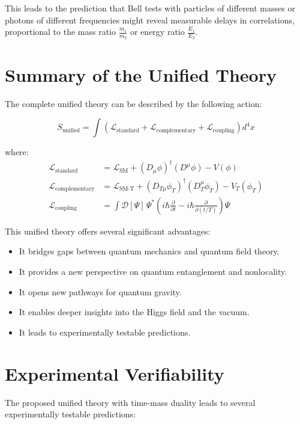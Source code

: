 \documentclass{article}
\begin{document}
	This leads to the prediction that Bell tests with particles of different masses or photons of different frequencies might reveal measurable delays in correlations, proportional to the mass ratio $\frac{m_1}{m_2}$ or energy ratio $\frac{E_1}{E_2}$.
	
	\section{Summary of the Unified Theory}
	
	The complete unified theory can be described by the following action:
	
	\begin{equation}
		S_\text{unified} = \int \left( \mathcal{L}_\text{standard} + \mathcal{L}_\text{complementary} + \mathcal{L}_\text{coupling} \right) d^4x
	\end{equation}
	
	where:
	\begin{align}
		\mathcal{L}_\text{standard} &= \mathcal{L}_\text{SM} + (D_\mu \phi)^\dagger (D^\mu \phi) - V(\phi) \\
		\mathcal{L}_\text{complementary} &= \mathcal{L}_\text{SM-T} + (D_{T\mu} \phi_T)^\dagger (D_T^\mu \phi_T) - V_T(\phi_T) \\
		\mathcal{L}_\text{coupling} &= \int \mathcal{D}[\Psi] \, \Psi^* \left( i\hbar \frac{\partial}{\partial t} - i\hbar \frac{\partial}{\partial (t/T)} \right) \Psi
	\end{align}
	
	This unified theory offers several significant advantages:
	\begin{itemize}
		\item It bridges gaps between quantum mechanics and quantum field theory.
		\item It provides a new perspective on quantum entanglement and nonlocality.
		\item It opens new pathways for quantum gravity.
		\item It enables deeper insights into the Higgs field and the vacuum.
		\item It leads to experimentally testable predictions.
	\end{itemize}
	
	\section{Experimental Verifiability}
	
	The proposed unified theory with time-mass duality leads to several experimentally testable predictions:
	
\end{document}
